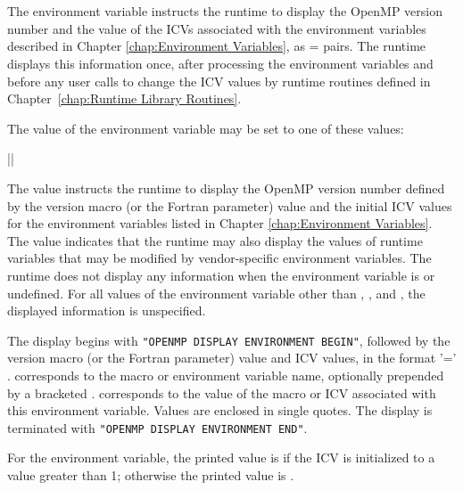 \section{}
\label{sec:OMP_DISPLAY_ENV}
The  environment variable instructs the runtime to
display the OpenMP version number and the value of the ICVs associated with
the environment variables described in Chapter \ref{chap:Environment Variables},
as  =  pairs. The runtime displays this information
once, after processing the environment variables and before any user calls
to change the ICV values by runtime routines defined in
Chapter~\ref{chap:Runtime Library Routines}.

The value of the  environment variable may be set
to one of these values:

{||}

The  value instructs the runtime to display the OpenMP version
number defined by the  version macro (or the 
Fortran parameter) value and the initial ICV values for the environment variables
listed in Chapter \ref{chap:Environment Variables}. The 
value indicates that the runtime may also display the values
of runtime variables that may be modified by vendor-specific
environment variables. The runtime does not display any information
when the  environment variable is
 or undefined. For all values of the environment
variable other than , , and ,
the displayed information is unspecified.

The display begins with \texttt{"OPENMP DISPLAY ENVIRONMENT BEGIN"},
followed by the  version macro (or the 
Fortran parameter) value and ICV values, in the format  '='
.  corresponds to the macro or environment variable
name, optionally prepended by a bracketed . 
corresponds to the value of the macro or ICV associated with this environment
variable. Values are enclosed in single quotes. The display is
terminated with \texttt{"OPENMP DISPLAY ENVIRONMENT END"}.

For the  environment variable, the printed value is
 if the  ICV is initialized to a
value greater than 1; otherwise the printed value is .

